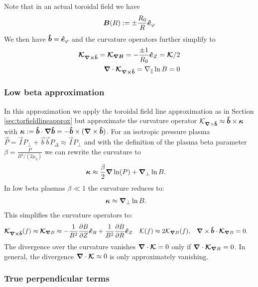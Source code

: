 Note that in an actual toroidal field we have
\begin{align}
  {\boldsymbol{B}}(R) := \pm \frac{R_0}{R} \bm{\hat{e}}_\varphi
  \label{}
\end{align}
We then have $\bm{\hat{b}} = \bm{\hat{e}}_\varphi$ and the curvature operators further
simplify to
\begin{align}
  {\boldsymbol{ \mathcal K_{{\boldsymbol{\nabla}}\times\bm{\hat{b}}}}} = {\boldsymbol{ \mathcal K_{{\boldsymbol{\nabla}} B}}} = -\frac{\pm 1}{R_0} \bm{\hat{e}}_Z =
{\boldsymbol{ \mathcal K}}/2\\
  {\boldsymbol{\nabla}}\cdot{\boldsymbol{\mathcal K_{{{\boldsymbol{\nabla}}\times\bm{\hat{b}}}}}}=
    \nabla_\parallel \ln B = 0
    \label{}
\end{align}

\subsubsection{Low beta approximation}\label{sec:lowbetaapprox}
In this approximation we apply the toroidal field line approximation
as in Section
\ref{sec:torfieldlineapprox}
but approximate the curvature operator $\mathcal K_{{\boldsymbol{\nabla}}\times\bm{\hat{b}}} \approx \bm{\hat{b}}\times{\boldsymbol{\kappa}}$
  with
  ${\boldsymbol{\kappa}} := \bm{\hat{b}} \cdot{\boldsymbol{\nabla}}\bm{\hat{b}} = -\bm{\hat{b}} \times( {\boldsymbol{\nabla}}\times \bm{\hat{b}})$.
For an isotropic pressure plasma \(\vec{P} = \vec{I} P_\perp + \vec{b} \vec{b} P_\Delta \approx \vec{I} P_\perp\) and with the definition of the plasma beta parameter
\(\beta = \frac{P}{B^2/(2 \mu_0) } \)
we can rewrite the curvature to
\begin{align}
    {\boldsymbol{\kappa}} &\approx \frac{\beta}{2} {\boldsymbol{\nabla}} \ln(P) +{\boldsymbol{\nabla}}_{\perp} \ln{B} .
\end{align}
In low beta plasmas \(\beta\ll1\) the curvature reduces to:
\begin{align}
    {\boldsymbol{\kappa}} & \approx {\boldsymbol{\nabla}}_{\perp} \ln{B} .
\end{align}
This simplifies the curvature operators to:
\begin{align}
{\boldsymbol{\mathcal{K}_{{{\boldsymbol{\nabla}}\times\bm{\hat{b}}}}}}(f) \approx
{\boldsymbol{ \mathcal{K} }}_{{\boldsymbol{\nabla}}  B}  &\approx  -\frac{1}{B^2}\frac{\partial B}{\partial Z}\bm{\hat{e}}_R +\frac{1}{B^2} \frac{\partial B}{\partial R}\bm{\hat{e}}_Z &
\mathcal{K} (f) &\approx 2\mathcal{K}_{{\boldsymbol{\nabla}}  B} (f) , &
    {\boldsymbol{\nabla}}\times\bm{\hat{b}} \cdot {\boldsymbol{\mathcal{K}}}_{{\boldsymbol{\nabla}}  B} &= 0.
\end{align}
The divergence over the curvature vanishes \( {\boldsymbol{\nabla}}\cdot {\boldsymbol{ \mathcal{K} }} = 0\) only if \( {\boldsymbol{\nabla}}\cdot {\boldsymbol{ \mathcal{K}}}_{{\boldsymbol{\nabla}}  B}   = 0\).
In general, the divergence \( {\boldsymbol{\nabla}}\cdot {\boldsymbol{ \mathcal{K} }} \approx 0\) is only approximately vanishing.
\subsubsection{True perpendicular terms}

